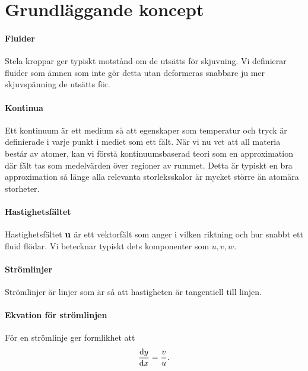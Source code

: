 \section{Grundläggande koncept}

\paragraph{Fluider}
Stela kroppar ger typiskt motstånd om de utsätts för skjuvning. Vi definierar fluider som ämnen som inte gör detta utan deformeras snabbare ju mer skjuvspänning de utsätts för.

\paragraph{Kontinua}
Ett kontinuum är ett medium så att egenskaper som temperatur och tryck är definierade i varje punkt i mediet som ett fält. När vi nu vet att all materia består av atomer, kan vi förstå kontinuumsbaserad teori som en approximation där fält tas som medelvärden över regioner av rummet. Detta är typiskt en bra approximation så länge alla relevanta storleksskalor är mycket större än atomära storheter.

\paragraph{Hastighetsfältet}
Hastighetsfältet $\vb{u}$ är ett vektorfält som anger i vilken riktning och hur snabbt ett fluid flödar. Vi betecknar typiskt dets komponenter som $u, v, w$.

\paragraph{Strömlinjer}
Strömlinjer är linjer som är så att hastigheten är tangentiell till linjen.

\paragraph{Ekvation för strömlinjen}
För en strömlinje ger formlikhet att
\begin{align*}
	\dv{y}{x} = \frac{v}{u}.
\end{align*}

